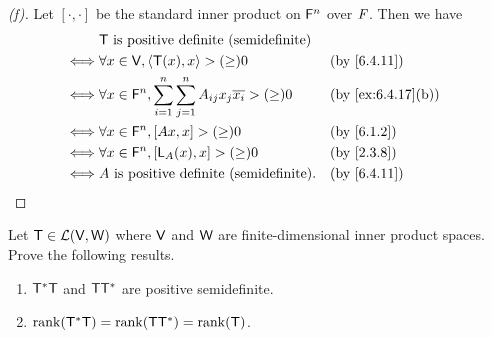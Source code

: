 \begin{proof}[(f)]
	Let \([\cdot, \cdot]\) be the standard inner product on \(\mathsf{F}^n\) over \(\mathit{F}\).
	Then we have
	\begin{align*}
		     & \T \text{ is positive definite (semidefinite)}                                                                 \\
		\iff & \forall x \in \V, \inn{\T(x), x} > (\geq) 0                                             &  & \by{6.4.11}       \\
		\iff & \forall x \in \vs{F}^n, \sum_{i = 1}^n \sum_{j = 1}^n A_{i j} x_j \conj{x_i} > (\geq) 0 &  & \by{ex:6.4.17}[b] \\
		\iff & \forall x \in \vs{F}^n, [Ax, x] > (\geq) 0                                              &  & \by{6.1.2}        \\
		\iff & \forall x \in \vs{F}^n, [\L_A(x), x] > (\geq) 0                                         &  & \by{2.3.8}        \\
		\iff & A \text{ is positive definite (semidefinite)}.                                          &  & \by{6.4.11}
	\end{align*}
\end{proof}

\begin{ex}\label{ex:6.4.18}
	Let \(\mathsf{T} \in \mathcal{L}(\mathsf{V}, \mathsf{W})\) where \(\mathsf{V}\) and \(\mathsf{W}\) are finite-dimensional inner product spaces.
	Prove the following results.
	\begin{enumerate}
		\item \(\mathsf{T}^* \mathsf{T}\) and \(\mathsf{T} \mathsf{T}^*\) are positive semidefinite.
		\item \(\rk{\T^* \T} = \rk{\T \T^*} = \rk{\T}\).
	\end{enumerate}
\end{ex}

